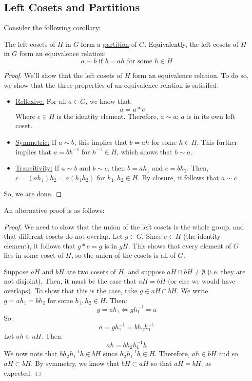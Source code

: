 \documentclass[letterpaper]{article}
\begin{document}
\subsection{Left Cosets and Partitions}
Consider the following corollary: 
\begin{corollary}{}{}
    The left cosets of $H$ in $G$ form a \underline{partition} of $G$. Equivalently, the left cosets of $H$ in $G$ form an equivalence relation: 
    \[a \sim b \text{ if } b = ah \text{ for some } h \in H\]
\end{corollary}
\begin{mdframed}
    \begin{proof}
        We'll show that the left cosets of $H$ form an equivalence relation. To do so, we show that the three properties of an equivalence relation is satisifed.  
        \begin{itemize}
            \item \underline{Reflexive:} For all $a \in G$, we know that: 
            \[a = a * e\]
            Where $e \in H$ is the identity element. Therefore, $a \sim a$; $a$ is in its own left coset. 
            
            \item \underline{Symmetric:} If $a \sim b$, this implies that $b = ah$ for some $h \in H$. This further implies that $a = bh^{-1}$ for $h^{-1} \in H$, which shows that $b \sim a$. 
            
            \item \underline{Transitivity:} If $a \sim b$ and $b \sim c$, then $b = ah_1$ and $c = bh_2$. Then, $c = (ah_1)h_2 = a(h_1 h_2)$ for $h_1, h_2 \in H$. By closure, it follows that $a \sim c$. 
        \end{itemize}
        So, we are done. 
    \end{proof}
\end{mdframed}

An alternative proof is as follows: 
\begin{mdframed}
    \begin{proof}
        We need to show that the union of the left cosets is the whole group, and that different cosets do not overlap. Let $g \in G$. Since $e \in H$ (the identity element), it follows that $g * e = g$ is in $gH$. This shows that every element of $G$ lies in some coset of $H$, so the union of the cosets is all of $G$. 

        \bigskip 

        Suppose $aH$ and $bH$ are two cosets of $H$, and suppose $aH \cap bH \neq \emptyset$ (i.e. they are not disjoint). Then, it must be the case that $aH = bH$ (or else we would have overlaps). To show that this is the case, take $g \in aH \cap bH$. We write $g = ah_1 = bh_2$ for some $h_1, h_2 \in H$. Then: 
        \[g = ah_1 \iff gh_{1}^{-1} = a\]
        So: 
        \[a = gh_{1}^{-1} = bh_2 h_{1}^{-1}\]
        Let $ah \in aH$. Then: 
        \[ah = bh_2 h_{1}^{-1}h\]
        We now note that $bh_2 h_{1}^{-1}h \in bH$ since $h_2 h_{1}^{-1}h \in H$. Therefore, $ah \in bH$ and so $aH \subset bH$. By symmetry, we know that $bH \subset aH$ so that $aH = bH$, as expected. 
    \end{proof}
\end{mdframed}
\end{document}
